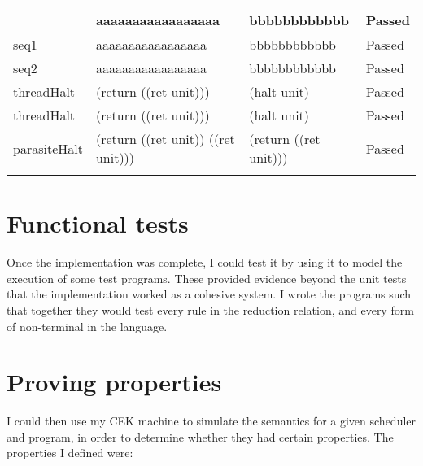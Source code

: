 \documentclass[12pt,a4paper,twoside,openright]{report}
\begin{document}
\begin{longtable}{| p{2.5cm} | p{5.5cm} |  p{5.5cm} | p{1.5cm} |}
\begin{comment}
pair3 & aaaaaaaaaaaaaaaaa & bbbbbbbbbbbb & Passed \\ \hline
seq1 & aaaaaaaaaaaaaaaaa & bbbbbbbbbbbb & Passed \\ \hline
seq2 & aaaaaaaaaaaaaaaaa & bbbbbbbbbbbb & Passed \\ \hline
threadHalt & (return ((ret unit))) & (halt unit) & Passed \\ \hline
threadHalt & (return ((ret unit))) & (halt unit) & Passed \\ \hline
parasiteHalt & (return ((ret unit)) ((ret unit))) & (return ((ret unit))) & Passed \\ \hline
\end{comment}
\end{longtable}

\section{Functional tests}\label{testfun}

Once the implementation was complete, I could test it by using it to model the execution of some test programs. These provided evidence beyond the unit tests that the implementation worked as a cohesive system. I wrote the programs such that together they would test every rule in the reduction relation, and every form of non-terminal in the language.
\section{Proving properties}\label{implproving}

I could then use my CEK machine to simulate the semantics for a given scheduler and program, in order to determine whether they had certain properties. The properties I defined were:
\end{document}
